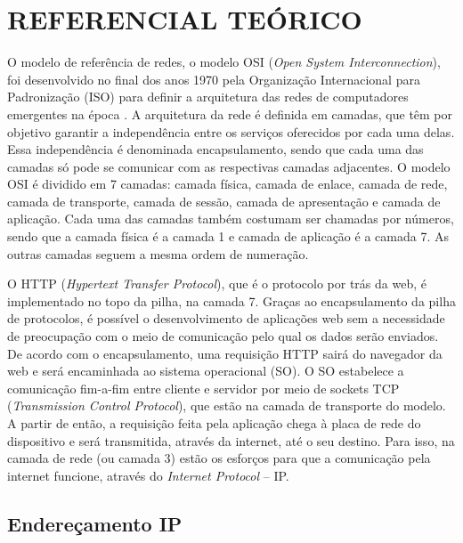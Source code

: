\chapter{REFERENCIAL TEÓRICO}
\label{cap:referencial}

    O modelo de referência de redes, o modelo OSI (\textit{Open System Interconnection}), foi desenvolvido no final dos anos 1970 pela Organização Internacional para Padronização (ISO) para definir a arquitetura das redes de computadores emergentes na época \cite{kurose2014}. A arquitetura da rede é definida em camadas, que têm por objetivo garantir a independência entre os serviços oferecidos por cada uma delas. Essa independência é denominada encapsulamento, sendo que cada uma das camadas só pode se comunicar com as respectivas camadas adjacentes. O modelo OSI é dividido em 7 camadas: camada física, camada de enlace, camada de rede, camada de transporte, camada de sessão, camada de apresentação e camada de aplicação. Cada uma das camadas também costumam ser chamadas por números, sendo que a camada física é a camada 1 e camada de aplicação é a camada 7. As outras camadas seguem a mesma ordem de numeração.
    
    O HTTP (\textit{Hypertext Transfer Protocol}), que é o protocolo por trás da web, é implementado no topo da pilha, na camada 7. Graças ao encapsulamento da pilha de protocolos, é possível o desenvolvimento de aplicações web sem a necessidade de preocupação com o meio de comunicação pelo qual os dados serão enviados. De acordo com o encapsulamento, uma requisição HTTP sairá do navegador da web e será encaminhada ao sistema operacional (SO). O SO estabelece a comunicação fim-a-fim entre cliente e servidor por meio de sockets TCP (\textit{Transmission Control Protocol}), que estão na camada de transporte do modelo. A partir de então, a requisição feita pela aplicação chega à placa de rede do dispositivo e será transmitida, através da internet, até o seu destino. Para isso, na camada de rede (ou camada 3) estão os esforços para que a comunicação pela internet funcione, através do \textit{Internet Protocol} -- IP.
    
\section{Endereçamento IP}
    
